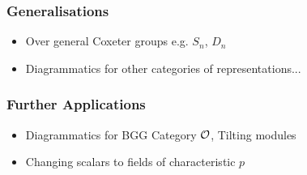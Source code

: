 \begin{frame}
    \frametitle{Generalisations}

    \begin{itemize}
        \item Over general Coxeter groups e.g. $S_n$, $D_n$
        \[
            
        \]
        \item Diagrammatics for other categories of representations...
    \end{itemize}
\end{frame}


\begin{frame}
    \frametitle{Further Applications}

    \begin{itemize}
        \item Diagrammatics for BGG Category $\mathcal{O}$, Tilting modules
        \item Changing scalars to fields of characteristic $p$
    \end{itemize}
\end{frame}

